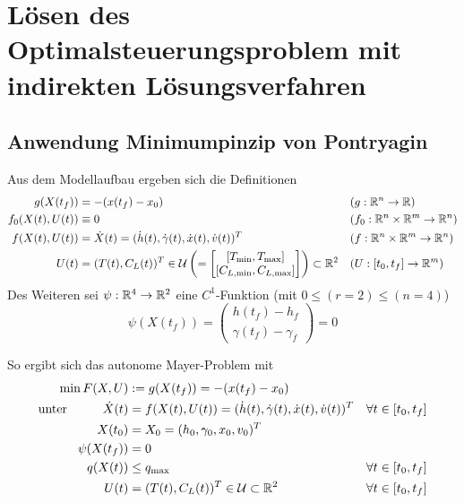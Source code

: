 \chapter{Lösen des Optimalsteuerungsproblem mit indirekten Lösungsverfahren}

\section{Anwendung Minimumpinzip von Pontryagin}
Aus dem Modellaufbau ergeben sich die Definitionen 
\begin{align*}
    g(X(t_f)) &=  -(x(t_f) - x_0) & & (g : \mathbb{R}^n \to \mathbb{R}) \\
    f_0(X(t),U(t)) &\equiv 0 & &(f_0 : \mathbb{R}^n \times \mathbb{R}^m \to \mathbb{R}^n)\\
    f(X(t),U(t)) &= \dot{X}(t) = (\dot{h}(t),\dot{\gamma}(t),\dot{x}(t),\dot{v}(t))^T & &(f : \mathbb{R}^n \times \mathbb{R}^m \to \mathbb{R}^n) \\
    U(t) &= (T(t),C_L(t))^T \in \mathcal{U} \left( = 
    \left[
        \begin{matrix}
            [T_{\min},T_{\max}] \\ 
            [C_{L, \min},C_{L, \max}]
        \end{matrix} 
    \right]\right) \subset \mathbb{R}^2 & &(U : [t_0,t_f] \to \mathbb{R}^m)
\end{align*}
Des Weiteren sei $\psi : \mathbb{R}^4 \to \mathbb{R}^2$ eine $C^1$-Funktion (mit $0 \leq (r = 2) \leq (n = 4)$) \[\psi(X(t_f)) = 
\begin{pmatrix}
    h(t_f) - h_f \\ 
    \gamma(t_f) - \gamma_f
\end{pmatrix} = 0\]

So ergibt sich das autonome Mayer-Problem mit 
\begin{equation} \label{equ:mayer_problem}
    \begin{aligned}
        \min F(X,U) &:= g(X(t_f)) =  -(x(t_f) - x_0) & & \\
        \text{unter}  \hspace{10mm} \dot{X}(t) &= f(X(t),U(t)) = (\dot{h}(t),\dot{\gamma}(t),\dot{x}(t),\dot{v}(t))^T & & \forall t \in [t_0,t_f] \\
        X(t_0) &= X_0 = (h_0,\gamma_0,x_0,v_0)^T & & \\
        \psi(X(t_f)) &= 0 & & \\
        q(X(t)) &\leq q_{\max} & & \forall t \in [t_0,t_f] \\
        U(t) &= (T(t),C_L(t))^T \in \mathcal{U} \subset \R^2  & & \forall t \in [t_0,t_f] 
    \end{aligned}
\end{equation}

